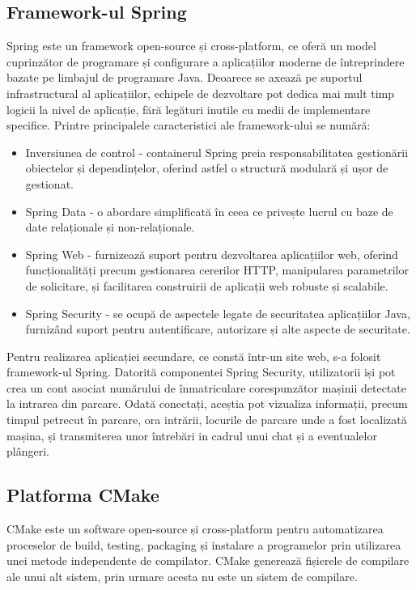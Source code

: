\documentclass[12pt]{article}
\begin{document}
\subsection{Framework-ul Spring}
Spring este un framework open-source și cross-platform, ce ofer\u{a} un model cuprinz\u{a}tor de programare și configurare a aplicațiilor moderne de \^{i}ntreprindere bazate pe limbajul de programare Java. Deoarece se axeaz\u{a} pe suportul infrastructural al aplicațiilor, echipele de dezvoltare pot dedica mai mult timp logicii la nivel de aplicație, f\u{a}r\u{a} leg\u{a}turi inutile cu medii de implementare specifice. Printre principalele caracteristici ale framework-ului se num\u{a}r\u{a}:
\begin{itemize}
    \item Inversiunea de control - containerul Spring preia responsabilitatea gestion\u{a}rii obiectelor și dependințelor, oferind astfel o structur\u{a} modular\u{a} și ușor de gestionat.
    \item Spring Data - o abordare simplificat\u{a} \^{i}n ceea ce privește lucrul cu baze de date relaționale și non-relaționale.
    \item Spring Web - furnizeaz\u{a} suport pentru dezvoltarea aplicațiilor web, oferind funcționalit\u{a}ți precum gestionarea cererilor HTTP, manipularea parametrilor de solicitare, și facilitarea construirii de aplicații web robuste și scalabile.
    \item Spring Security - se ocup\u{a} de aspectele legate de securitatea aplicațiilor Java, furniz\^{a}nd suport pentru autentificare, autorizare și alte aspecte de securitate.
\end{itemize}

Pentru realizarea aplicației secundare, ce const\u{a} \^{i}ntr-un site web, s-a folosit framework-ul Spring. Datorit\u{a} componentei Spring Security, utilizatorii iși pot crea un cont asociat num\u{a}rului de \^{i}nmatriculare corespunz\u{a}tor mașinii detectate la intrarea din parcare. Odat\u{a} conectați, aceștia pot vizualiza informații, precum timpul petrecut \^{i}n parcare, ora intr\u{a}rii, locurile de parcare unde a fost localizat\u{a} mașina, și transmiterea unor \^{i}ntreb\u{a}ri in cadrul unui chat și a eventualelor pl\^{a}ngeri.

\subsection{Platforma CMake}
CMake este un software open-source și cross-platform pentru automatizarea proceselor de build, testing, packaging și instalare a programelor prin utilizarea unei metode independente de compilator. CMake genereaz\u{a} fișierele de compilare ale unui alt sistem, prin urmare acesta nu este un sistem de compilare.
\end{document}
